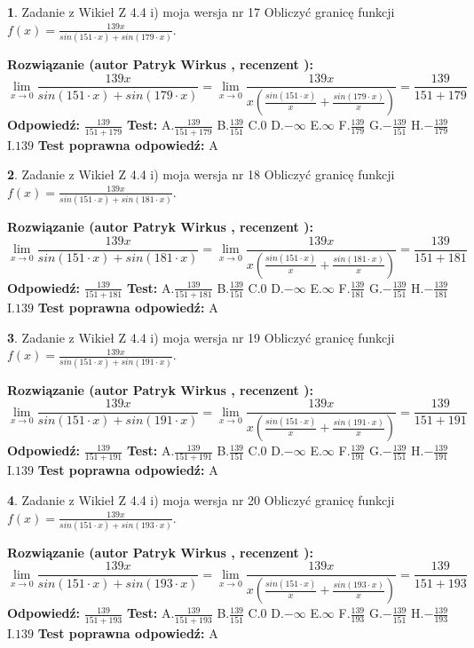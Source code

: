 \documentclass[12pt, a4paper]{article}
\theoremstyle{definition} %
\newtheorem{zad}{}
\newcommand{\zadStart}[1]{\begin{zad}#1\newline}
\newcommand{\zadStop}{\end{zad}}
\newcommand{\rozwStart}[2]{\noindent \textbf{Rozwiązanie (autor #1 , recenzent #2): }\newline}
\newcommand{\rozwStop}{\newline}
\newcommand{\odpStart}{\noindent \textbf{Odpowiedź:}\newline}
\newcommand{\odpStop}{\newline}
\newcommand{\testStart}{\noindent \textbf{Test:}\newline}
\newcommand{\testStop}{\newline}
\newcommand{\kluczStart}{\noindent \textbf{Test poprawna odpowiedź:}\newline}
\newcommand{\kluczStop}{\newline}
\begin{document}
\zadStart{Zadanie z Wikieł Z 4.4 i) moja wersja nr 17}
Obliczyć granicę funkcji $f(x)=\frac{139x}{sin(151\cdot x) +sin(179\cdot x)}$.
\zadStop
\rozwStart{Patryk Wirkus}{}
$$\lim\limits_{x\to 0}\frac{139x}{sin(151\cdot x) +sin(179\cdot x)}=\lim\limits_{x\to 0}\frac{139x}{x(\frac{sin(151\cdot x)}{x}+\frac{sin(179\cdot x)}{x})}=\frac{139}{151+179}$$
\rozwStop
\odpStart
$\frac{139}{151+179}$
\odpStop
\testStart
A.$\frac{139}{151+179}$
B.$\frac{139}{151}$
C.$0$
D.$-\infty$
E.$\infty$
F.$\frac{139}{179}$
G.$-\frac{139}{151}$
H.$-\frac{139}{179}$
I.$139$
\testStop
\kluczStart
A
\kluczStop



\zadStart{Zadanie z Wikieł Z 4.4 i) moja wersja nr 18}
Obliczyć granicę funkcji $f(x)=\frac{139x}{sin(151\cdot x) +sin(181\cdot x)}$.
\zadStop
\rozwStart{Patryk Wirkus}{}
$$\lim\limits_{x\to 0}\frac{139x}{sin(151\cdot x) +sin(181\cdot x)}=\lim\limits_{x\to 0}\frac{139x}{x(\frac{sin(151\cdot x)}{x}+\frac{sin(181\cdot x)}{x})}=\frac{139}{151+181}$$
\rozwStop
\odpStart
$\frac{139}{151+181}$
\odpStop
\testStart
A.$\frac{139}{151+181}$
B.$\frac{139}{151}$
C.$0$
D.$-\infty$
E.$\infty$
F.$\frac{139}{181}$
G.$-\frac{139}{151}$
H.$-\frac{139}{181}$
I.$139$
\testStop
\kluczStart
A
\kluczStop



\zadStart{Zadanie z Wikieł Z 4.4 i) moja wersja nr 19}
Obliczyć granicę funkcji $f(x)=\frac{139x}{sin(151\cdot x) +sin(191\cdot x)}$.
\zadStop
\rozwStart{Patryk Wirkus}{}
$$\lim\limits_{x\to 0}\frac{139x}{sin(151\cdot x) +sin(191\cdot x)}=\lim\limits_{x\to 0}\frac{139x}{x(\frac{sin(151\cdot x)}{x}+\frac{sin(191\cdot x)}{x})}=\frac{139}{151+191}$$
\rozwStop
\odpStart
$\frac{139}{151+191}$
\odpStop
\testStart
A.$\frac{139}{151+191}$
B.$\frac{139}{151}$
C.$0$
D.$-\infty$
E.$\infty$
F.$\frac{139}{191}$
G.$-\frac{139}{151}$
H.$-\frac{139}{191}$
I.$139$
\testStop
\kluczStart
A
\kluczStop



\zadStart{Zadanie z Wikieł Z 4.4 i) moja wersja nr 20}
Obliczyć granicę funkcji $f(x)=\frac{139x}{sin(151\cdot x) +sin(193\cdot x)}$.
\zadStop
\rozwStart{Patryk Wirkus}{}
$$\lim\limits_{x\to 0}\frac{139x}{sin(151\cdot x) +sin(193\cdot x)}=\lim\limits_{x\to 0}\frac{139x}{x(\frac{sin(151\cdot x)}{x}+\frac{sin(193\cdot x)}{x})}=\frac{139}{151+193}$$
\rozwStop
\odpStart
$\frac{139}{151+193}$
\odpStop
\testStart
A.$\frac{139}{151+193}$
B.$\frac{139}{151}$
C.$0$
D.$-\infty$
E.$\infty$
F.$\frac{139}{193}$
G.$-\frac{139}{151}$
H.$-\frac{139}{193}$
I.$139$
\testStop
\kluczStart
A
\kluczStop
\end{document}
